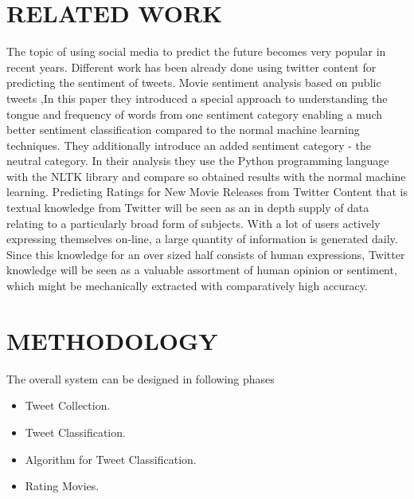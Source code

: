 \documentclass[a4paper]{article}
\begin{document}
\section{RELATED WORK}
\label{sec:relatedwork}
The topic of using social media to predict the future becomes
very popular in recent years. Different work has been already
done using twitter content for predicting the sentiment of
tweets. Movie sentiment analysis based on public tweets \cite{ref1}
,In this paper they introduced a special approach to
understanding the tongue and frequency of words from one 
sentiment category enabling a much better sentiment
classification compared to the normal machine learning
techniques. They additionally introduce an added sentiment
category - the neutral category. In their analysis they use the
Python programming language with the NLTK library and
compare so obtained results with the normal machine
learning. Predicting Ratings for New Movie Releases from
Twitter Content that is textual knowledge from Twitter
will be seen as an in depth supply of data relating to a
particularly broad form of subjects. With a lot of users
actively expressing themselves on-line, a large quantity of
information is generated daily. Since this knowledge for an
over sized half consists of human expressions, Twitter
knowledge will be seen as a valuable assortment of human
opinion or sentiment, which might be mechanically extracted
with comparatively high accuracy.

\section{METHODOLOGY}
The overall system can be designed in following phases
\begin{itemize}
  \item Tweet Collection.
  \item Tweet Classification.
  \item Algorithm for Tweet Classification.
  \item Rating Movies.
\end{itemize}
\end{document}

